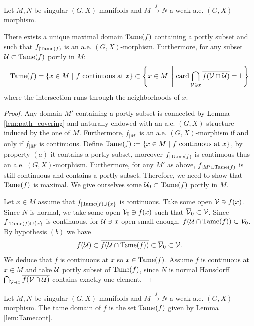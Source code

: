\begin{lem}\label{lem:Tamecont}
Let $M,N$ be singular $(G,X)$-manifolds and $M\xrightarrow{f} N$ a weak a.e. $(G,X)$-morphism.

There exists a unique maximal domain $\mathrm{Tame}(f)$ containing a portly subset and such that $f_{|\mathrm{Tame}(f)}$ is an a.e. $(G,X)$-morphism.
Furthermore, for any subset $\mathcal{U}\subset\mathrm{Tame}(f)$ portly in $M$:  $$\mathrm{Tame}(f) = \{x\in M ~|~ f \text{ continuous at } x\} \subset \left\{x\in M ~\left|~ \mathrm{card}\bigcap_{ \mathcal V \ni x} \overline{f(\mathcal V \cap \mathcal{U})}=1 \right. \right\}$$
where the intersection runs through the neighborhoods of $x$.
\end{lem}
\begin{proof}



Any domain $M'$ containing a portly subset is connected by 
Lemma \ref{lem:path_covering} and naturally endowed with an a.e. $(G,X)$-structure induced by the one of $M$. Furthermore, $f_{|M'}$ is an a.e. $(G,X)$-morphism if and only if $f_{|M'}$ is continuous.
Define $\mathrm{Tame}(f):= \{x\in M ~|~ f \text{ continuous at } x\}$, by property $(a)$ it contains a portly subset, moreover $f_{|\mathrm{Tame}(f)}$ is continuous thus an a.e. $(G,X)$-morphism.
Furthermore, for any $M'$ as above, $f_{|M'\cup\mathrm{Tame}(f)}$ is still continuous and contains a portly subset. 
Therefore, we need to show that $\mathrm{Tame}(f)$ is maximal. We give ourselves some $\mathcal{U}_0 \subset \mathrm{Tame}(f)$ portly in $M$.

Let $x\in M$ assume that $f_{|\mathrm{Tame}(f)\cup \{x\}}$ is continuous. Take some open $\mathcal V\ni f(x)$. Since $N$ is normal, we take some open $\mathcal V_0\ni f(x)$ such that $\overline {\mathcal V}_0 \subset \mathcal V$. Since $f_{|\mathrm{Tame}(f)\cup\{x\}}$ is continuous, for $\mathcal{U}\ni x $ open small enough,  $f(\mathcal{U}\cap \mathrm{Tame}(f))\subset \mathcal V_0$. By  hypothesis $(b)$ we have 
$$f(\mathcal{U}) \subset \overline{f(\mathcal{U}\cap\mathrm{Tame}(f))} \subset \overline {\mathcal V}_0 \subset \mathcal V.$$
We deduce that $f$ is continuous at $x$ so $x\in \mathrm{Tame}(f)$.
Assume $f$ is continuous at $x\in M$ and take $\mathcal{U}$ portly subset of $\mathrm{Tame}(f)$, since $N$ is normal Hausdorff 
$\bigcap_{\mathcal V\ni x}\overline{f(\mathcal V\cap \mathcal{U})}$ contains exactly one element. 

\end{proof}
\begin{defi} Let $M,N$ be singular $(G,X)$-manifolds and $M\xrightarrow{f} N$ a weak a.e. $(G,X)$-morphism. The tame domain of $f$ is the set $\mathrm{Tame}(f)$ given by Lemma \ref{lem:Tamecont}.
\end{defi}

